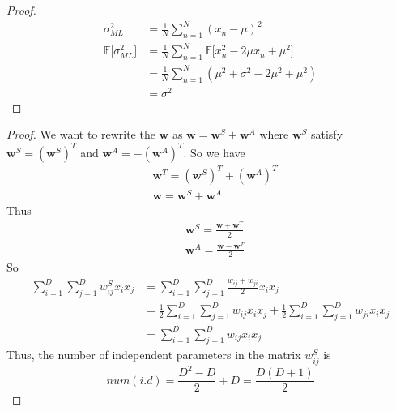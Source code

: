 \documentclass[12pt]{article}
\newcommand{\E}{\mathbb{E}}
\newenvironment{exercise}[2][Ex]{\begin{trivlist}
\item[\hskip \labelsep {\bfseries #1}\hskip \labelsep {\bfseries #2.}]}{\end{trivlist}}
\begin{document}
\begin{exercise}{1.13(*)}
    \begin{proof}
        \begin{align*}
            \sigma^2_{ML}&=\frac{1}{N}\sum_{n=1}^N(x_n-\mu)^2\\
            \E\lbrack \sigma^2_{ML}\rbrack&=\frac{1}{N}\sum_{n=1}^N\E\lbrack x_n^2-2\mu x_n+
            \mu^2\rbrack\\
            &=\frac{1}{N}\sum_{n=1}^N(\mu^2+\sigma^2-2\mu^2+\mu^2)\\
            &=\sigma^2
        \end{align*}
    \end{proof}
\end{exercise}
\begin{exercise}{1.14(*)}
    \begin{proof}
        We want to rewrite the $\bm{w}$ as $\bm{w}=\bm{w}^S+\bm{w}^A$ where $\bm{w}^S$ satisfy
        $\bm{w}^S=(\bm{w}^S)^T$ and $\bm{w}^A=-(\bm{w}^A)^T$. So we have
        \begin{align*}
            &\bm{w}^T=(\bm{w}^S)^T+(\bm{w}^A)^T\\
            &\bm{w}=\bm{w}^S+\bm{w}^A
        \end{align*}
        Thus
        \begin{align*}
            &\bm{w}^S=\frac{\bm{w}+\bm{w}^T}{2}\\
            &\bm{w}^A=\frac{\bm{w}-\bm{w}^T}{2}
        \end{align*}
        So
        \begin{align*}
            \sum_{i=1}^D\sum_{j=1}^Dw_{ij}^Sx_ix_j&=\sum_{i=1}^D\sum_{j=1}^D\frac{w_{ij}+w_{ji}}
            {2}x_ix_j\\
            &=\frac{1}{2}\sum_{i=1}^D\sum_{j=1}^Dw_{ij}x_ix_j+\frac{1}{2}\sum_{i=1}^D
            \sum_{j=1}^Dw_{ji}x_ix_j\\
            &=\sum_{i=1}^D\sum_{j=1}^Dw_{ij}x_ix_j
        \end{align*}
        Thus, the number of independent parameters in the matrix $w_{ij}^S$ is 
        \begin{equation}
            \label{eq1}
            num(i.d)=\frac{D^2-D}{2}+D=\frac{D(D+1)}{2}
        \end{equation}
    \end{proof}
\end{exercise}
\end{document}
